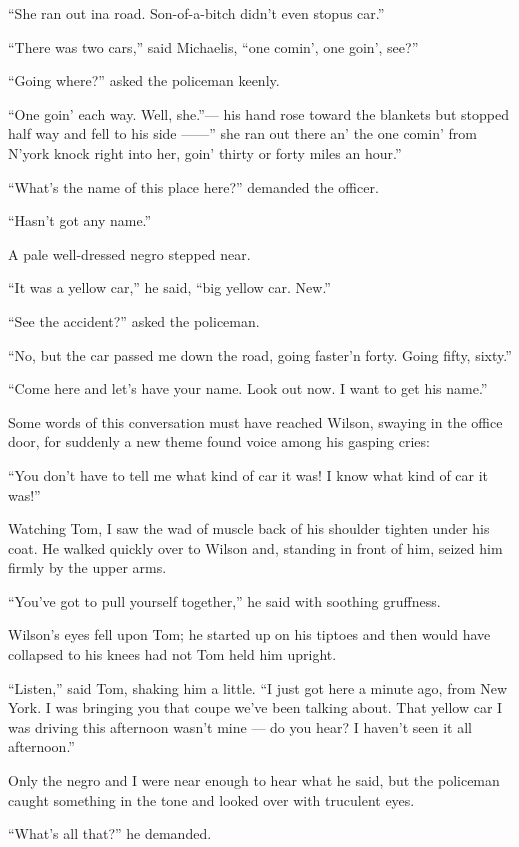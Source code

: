 \documentclass{znotebook}
\begin{document}
``She ran out ina road. Son-of-a-bitch didn't even stopus car.''

``There was two cars,'' said Michaelis, ``one comin', one goin', see?''

``Going where?'' asked the policeman keenly.

``One goin' each way. Well, she.''— his hand rose toward the blankets but stopped half way and fell to his side ——'' she ran out there an' the one comin' from N'york knock right into her, goin' thirty or forty miles an hour.''

``What's the name of this place here?'' demanded the officer.

``Hasn't got any name.''

A pale well-dressed negro stepped near.

``It was a yellow car,'' he said, ``big yellow car. New.''

``See the accident?'' asked the policeman.

``No, but the car passed me down the road, going faster'n forty. Going fifty, sixty.''

``Come here and let's have your name. Look out now. I want to get his name.''

Some words of this conversation must have reached Wilson, swaying in the office door, for suddenly a new theme found voice among his gasping cries:

``You don't have to tell me what kind of car it was! I know what kind of car it was!''

Watching Tom, I saw the wad of muscle back of his shoulder tighten under his coat. He walked quickly over to Wilson and, standing in front of him, seized him firmly by the upper arms.

``You've got to pull yourself together,'' he said with soothing gruffness.

Wilson's eyes fell upon Tom; he started up on his tiptoes and then would have collapsed to his knees had not Tom held him upright.

``Listen,'' said Tom, shaking him a little. ``I just got here a minute ago, from New York. I was bringing you that coupe we've been talking about. That yellow car I was driving this afternoon wasn't mine — do you hear? I haven't seen it all afternoon.''

Only the negro and I were near enough to hear what he said, but the policeman caught something in the tone and looked over with truculent eyes.

``What's all that?'' he demanded.
\end{document}
